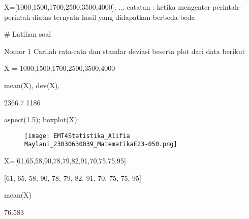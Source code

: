 \documentclass{article}
\begin{document}
\>X=[1000,1500,1700,2500,3500,4000]; ...  
\>  
catatan : ketika mengenter perintah-perintah diatas ternyata hasil
yang didapatkan berbeda-beda


# Latihan soal 

Nomor 1 Carilah rata-rata dan standar deviasi beserta plot dari data
berikut


X = 1000,1500,1700,2500,3500,4000


\>mean(X), dev(X),


    2366.7
    1186

\>aspect(1.5); boxplot(X):


\begin{figure}
    \centering
    \texttt{[image: EMT4Statistika\_Alifia Maylani\_23030630039\_MatematikaE23-050.png]}
    \caption{}
    \label{fig:enter-label}
\end{figure}

\>X=[61,65,58,90,78,79,82,91,70,75,75,95]


    [61,  65,  58,  90,  78,  79,  82,  91,  70,  75,  75,  95]

\>mean(X)


    76.583

\maketitle
\end{document}
